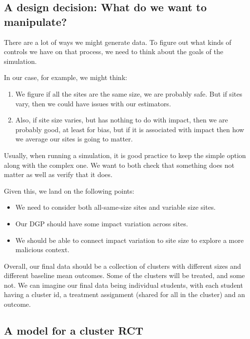\documentclass[
]{book}
\providecommand{\tightlist}{%
  \setlength{\itemsep}{0pt}\setlength{\parskip}{0pt}}
\begin{document}
\hypertarget{a-design-decision-what-do-we-want-to-manipulate}{%
\subsection{A design decision: What do we want to manipulate?}\label{a-design-decision-what-do-we-want-to-manipulate}}

There are a lot of ways we might generate data.
To figure out what kinds of controls we have on that process, we need to think about the goals of the simulation.

In our case, for example, we might think:

\begin{enumerate}
\def\labelenumi{\arabic{enumi})}
\tightlist
\item
  We figure if all the sites are the same size, we are probably safe. But if sites vary, then we could have issues with our estimators.
\item
  Also, if site size varies, but has nothing to do with impact, then we are probably good, at least for bias, but if it is associated with impact then how we average our sites is going to matter.
\end{enumerate}

Usually, when running a simulation, it is good practice to keep the simple option along with the complex one.
We want to both check that something does not matter as well as verify that it does.

Given this, we land on the following points:

\begin{itemize}
\tightlist
\item
  We need to consider both all-same-size sites and variable size sites.
\item
  Our DGP should have some impact variation across sites.
\item
  We should be able to connect impact variation to site size to explore a more malicious context.
\end{itemize}

Overall, our final data should be a collection of clusters with different sizes and different baseline mean outcomes.
Some of the clusters will be treated, and some not.
We can imagine our final data being individual students, with each student having a cluster id, a treatment assignment (shared for all in the cluster) and an outcome.

\hypertarget{a-model-for-a-cluster-rct}{%
\subsection{A model for a cluster RCT}\label{a-model-for-a-cluster-rct}}
\end{document}
